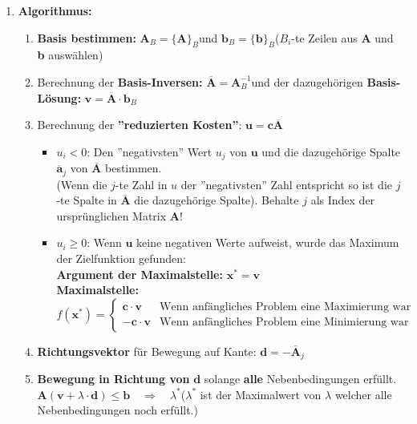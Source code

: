 \begin{enumerate}
\item \textbf{Algorithmus:}
	\begin{enumerate}
	\item \textbf{Basis bestimmen: } $\boxed{\mathbf{A}_B=\{\mathbf{A}\}_{B}}$\quad und \quad $\boxed{\mathbf{b}_{B}=\{\mathbf{b}\}_{B}}$\quad ($B_i$-te Zeilen aus \textbf{A} und \textbf{b} auswählen)\\
	\item Berechnung der \textbf{Basis-Inversen: }$\boxed{\overline{\mathbf{A}}=\mathbf{A}_B^{-1}}$\quad und der dazugehörigen \textbf{Basis-Lösung: }$\boxed{\mathbf{v}=\mathbf{\overline{A}}\cdot\mathbf{b}_B}$\\
	\item Berechnung der \textbf{''reduzierten Kosten''}: $\boxed{\mathbf{u}=\mathbf{c\overline{A}}}$
	\begin{itemize}
		\item $u_i<0$: Den ''negativsten'' Wert $u_j$ von $\mathbf{u}$ und die dazugehörige Spalte $\mathbf{\overline{a}}_j$ von $\mathbf{\overline{A}}$ bestimmen.\\
		(Wenn die $j$-te Zahl in $u$ der ''negativsten'' Zahl entspricht so ist die $j$-te Spalte in $\mathbf{\overline{A}}$ die dazugehörige Spalte). Behalte $j$ als Index der ursprünglichen Matrix $\mathbf{A}$!
		\item $u_i\geq 0$: Wenn $\mathbf{u}$ keine negativen Werte aufweist, wurde das Maximum der Zielfunktion gefunden:\\
		\textbf{Argument der Maximalstelle:} $\boxed{\mathbf{x^*}=\mathbf{v}}$\\
		\textbf{Maximalstelle:} 
		$\boxed{f(\mathbf{x^*})=\left\{
		  \begin{array}{ll}
		    \mathbf{c}\cdot\mathbf{v} & \text{Wenn anfängliches Problem eine Maximierung war}\\
		    -\mathbf{c}\cdot\mathbf{v}& \text{Wenn anfängliches Problem eine Minimierung war}
		  \end{array}
		\right.}$
	\end{itemize}
	\item \textbf{Richtungsvektor} für Bewegung auf Kante: $\boxed{\mathbf{d}=-\mathbf{\overline{A}}_j}$
	\item \textbf{Bewegung in Richtung von} $\mathbf{d}$ solange \textbf{alle} Nebenbedingungen erfüllt.\\
	
	$\boxed{\mathbf{A}(\mathbf{v}+\lambda\cdot \mathbf{d})\leq \mathbf{b}}\quad\Rightarrow\quad\lambda^*$\quad($\lambda^*$ ist der Maximalwert von $\lambda$ welcher alle Nebenbedingungen noch erfüllt.)\\
		

\end{enumerate}
\end{enumerate}
